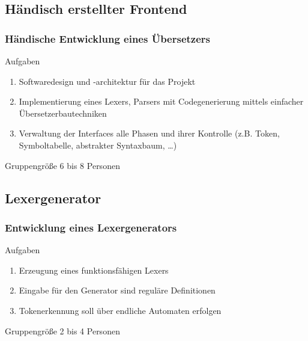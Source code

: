 \documentclass[ucs,9pt]{beamer}
\begin{document}
\subsection{Händisch erstellter Frontend}
\begin{frame}
  \frametitle{Händische Entwicklung eines Übersetzers}

  \begin{block}{Aufgaben}
    \begin{enumerate}
      \item Softwaredesign und -architektur für das Projekt
      \item Implementierung eines Lexers, Parsers mit Codegenerierung mittels einfacher Übersetzerbautechniken
      \item Verwaltung der Interfaces alle Phasen und ihrer Kontrolle (z.B. Token, Symboltabelle, abstrakter Syntaxbaum, \ldots) 
    \end{enumerate}
  \end{block}

  \begin{block}{Gruppengröße}
    6 bis 8 Personen
  \end{block}
\end{frame}

\subsection{Lexergenerator}
\begin{frame}
  \frametitle{Entwicklung eines Lexergenerators}

  \begin{block}{Aufgaben}
    \begin{enumerate}
      \item Erzeugung eines funktionsfähigen Lexers
      \item Eingabe für den Generator sind reguläre Definitionen
      \item Tokenerkennung soll über endliche Automaten erfolgen 
    \end{enumerate}
  \end{block}

  \begin{block}{Gruppengröße}
    2 bis 4 Personen
  \end{block}
\end{frame}
\end{document}
